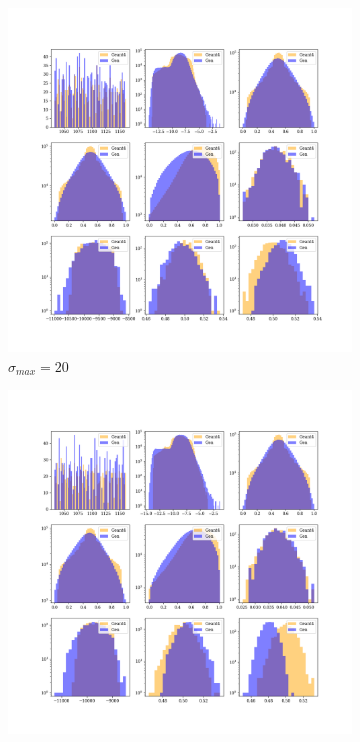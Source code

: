 \begin{figure}
    \centering
    \begin{subfigure}[b]{0.23\textwidth}
        \centering
        \includegraphics[width=\textwidth]{Figures/ve20_1dpng.png}
        \caption{$\sigma_{max}=20$}
        \label{fig:ve20_1}
    \end{subfigure}
    \hfill
    \begin{subfigure}[b]{0.23\textwidth}
        \centering
        \includegraphics[width=\textwidth]{Figures/ve10_1.png}

\end{subfigure}
\end{figure}
